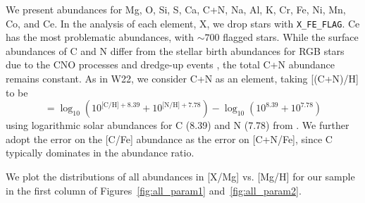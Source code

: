 \documentclass[modern]{aastex631}
\begin{document}
We present abundances for Mg, O, Si, S, Ca, C+N, Na, Al, K, Cr, Fe, Ni, Mn, Co, and Ce. In the analysis of each element, X, we drop stars with \texttt{X\_FE\_FLAG}. Ce has the most problematic abundances, with $\sim 700$ flagged stars. While the surface abundances of C and N differ from the stellar birth abundances for RGB stars due to the CNO processes and dredge-up events \citep{iben1965, shetrone2019}, the total C+N abundance remains constant. As in W22, we consider C+N as an element, taking [(C+N)/H] to be 
\begin{equation}
    [\text{C+N}/\text{H}] = \log_{10}(10^{\text{[C/H]}+8.39} + 10^{\text{[N/H]}+7.78}) - \log_{10}(10^{8.39} + 10^{7.78})
\end{equation}
using logarithmic solar abundances for C (8.39) and N (7.78) from \citet{grevesse2007}. We further adopt the error on the [C/Fe] abundance as the error on [C+N/Fe], since C typically dominates in the abundance ratio.

We plot the distributions of all abundances in [X/Mg] vs. [Mg/H] for our sample in the first column of Figures~\ref{fig:all_param1} and~\ref{fig:all_param2}. 
\end{document}
